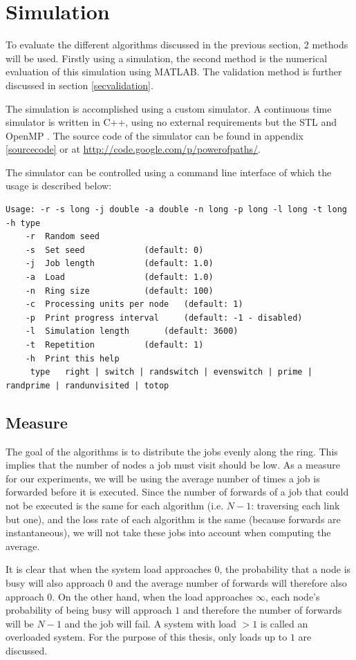 \documentclass[10pt,a4paper]{article}
\begin{document}
\section{Simulation}
\label{secsimulation}
To evaluate the different algorithms discussed in the previous section, 2 methods will be used. Firstly using a simulation, the second method is the numerical evaluation of this simulation using MATLAB. The validation method is further discussed in section \ref{secvalidation}.

The simulation is accomplished using a custom simulator. A continuous time simulator is written in C++, using no external requirements but the STL and OpenMP \cite{OPENMP}. The source code of the simulator can be found in appendix \ref{sourcecode} or at \url{http://code.google.com/p/powerofpaths/}.

The simulator can be controlled using a command line interface of which the usage is described below:
\begin{lstlisting}
Usage: -r -s long -j double -a double -n long -p long -l long -t long -h type
	-r	Random seed
	-s	Set seed			(default: 0)
	-j	Job length			(default: 1.0)
	-a	Load				(default: 1.0)
	-n	Ring size			(default: 100)
	-c	Processing units per node	(default: 1)
	-p	Print progress interval		(default: -1 - disabled)
	-l	Simulation length		(default: 3600)
	-t	Repetition			(default: 1)
	-h	Print this help
	 type	right | switch | randswitch | evenswitch | prime | randprime | randunvisited | totop
\end{lstlisting}

\subsection{Measure}
The goal of the algorithms is to distribute the jobs evenly along the ring. This implies that the number of nodes a job must visit should be low. As a measure for our experiments, we will be using the average number of times a job is forwarded before it is executed. Since the number of forwards of a job that could not be executed is the same for each algorithm (i.e. $N-1$: traversing each link but one), and the loss rate of each algorithm is the same (because forwards are instantaneous), we will not take these jobs into account when computing the average.

It is clear that when the system load approaches $0$, the probability that a node is busy will also approach $0$ and the average number of forwards will therefore also approach $0$. On the other hand, when the load approaches $\infty$, each node's probability of being busy will approach $1$ and therefore the number of forwards will be $N-1$ and the job will fail. A system with load $> 1$ is called an overloaded system. For the purpose of this thesis, only loads up to $1$ are discussed.
\end{document}
